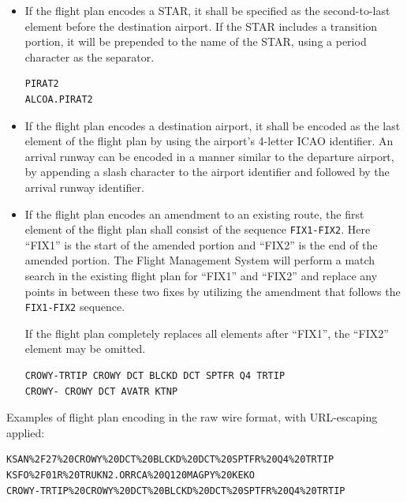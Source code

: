\documentclass[a4paper,12pt]{article}
\begin{document}
\begin{description}
\begin{itemize}
\item If the flight plan encodes a STAR, it shall be specified as the
second-to-last element before the destination airport. If the STAR
includes a transition portion, it will be prepended to the name of
the STAR, using a period character as the separator.

\begin{verbatim}
PIRAT2
ALCOA.PIRAT2
\end{verbatim}

\item If the flight plan encodes a destination airport, it shall be
encoded as the last element of the flight plan by using the airport's
4-letter ICAO identifier. An arrival runway can be encoded in a manner
similar to the departure airport, by appending a slash character to the
airport identifier and followed by the arrival runway identifier.

\item If the flight plan encodes an amendment to an existing route,
the first element of the flight plan shall consist of the sequence
\texttt{FIX1-FIX2}. Here ``FIX1'' is the start of the amended portion
and ``FIX2'' is the end of the amended portion. The Flight Management
System will perform a match search in the existing flight plan for
``FIX1'' and ``FIX2'' and replace any points in between these two fixes
by utilizing the amendment that follows the \texttt{FIX1-FIX2} sequence.

If the flight plan completely replaces all elements after ``FIX1'', the
``FIX2'' element may be omitted.

\begin{verbatim}
CROWY-TRTIP CROWY DCT BLCKD DCT SPTFR Q4 TRTIP
CROWY- CROWY DCT AVATR KTNP
\end{verbatim}

\end{itemize}

Examples of flight plan encoding in the raw wire format, with URL-escaping
applied:

\begin{verbatim}
KSAN%2F27%20CROWY%20DCT%20BLCKD%20DCT%20SPTFR%20Q4%20TRTIP
KSFO%2F01R%20TRUKN2.ORRCA%20Q120MAGPY%20KEKO
CROWY-TRTIP%20CROWY%20DCT%20BLCKD%20DCT%20SPTFR%20Q4%20TRTIP
\end{verbatim}

\end{description}
\end{document}
